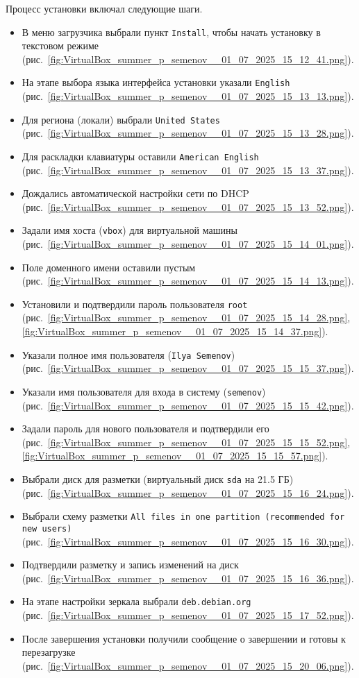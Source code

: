 Процесс установки включал следующие шаги.
\begin{itemize}
    \item В меню загрузчика выбрали пункт \texttt{Install}, чтобы начать установку в текстовом режиме (рис.~\ref{fig:VirtualBox_summer_p_semenov__01_07_2025_15_12_41.png}).
    \item На этапе выбора языка интерфейса установки указали \texttt{English} (рис.~\ref{fig:VirtualBox_summer_p_semenov__01_07_2025_15_13_13.png}).
    \item Для региона (локали) выбрали \texttt{United States} (рис.~\ref{fig:VirtualBox_summer_p_semenov__01_07_2025_15_13_28.png}).
    \item Для раскладки клавиатуры оставили \texttt{American English} (рис.~\ref{fig:VirtualBox_summer_p_semenov__01_07_2025_15_13_37.png}).
    \item Дождались автоматической настройки сети по DHCP (рис.~\ref{fig:VirtualBox_summer_p_semenov__01_07_2025_15_13_52.png}).
    \item Задали имя хоста (\texttt{vbox}) для виртуальной машины (рис.~\ref{fig:VirtualBox_summer_p_semenov__01_07_2025_15_14_01.png}).
    \item Поле доменного имени оставили пустым (рис.~\ref{fig:VirtualBox_summer_p_semenov__01_07_2025_15_14_13.png}).
    \item Установили и подтвердили пароль пользователя \texttt{root} (рис.~\ref{fig:VirtualBox_summer_p_semenov__01_07_2025_15_14_28.png}, \ref{fig:VirtualBox_summer_p_semenov__01_07_2025_15_14_37.png}).
    \item Указали полное имя пользователя (\texttt{Ilya Semenov}) (рис.~\ref{fig:VirtualBox_summer_p_semenov__01_07_2025_15_15_37.png}).
    \item Указали имя пользователя для входа в систему (\texttt{semenov}) (рис.~\ref{fig:VirtualBox_summer_p_semenov__01_07_2025_15_15_42.png}).
    \item Задали пароль для нового пользователя и подтвердили его (рис.~\ref{fig:VirtualBox_summer_p_semenov__01_07_2025_15_15_52.png}, \ref{fig:VirtualBox_summer_p_semenov__01_07_2025_15_15_57.png}).
    \item Выбрали диск для разметки (виртуальный диск \texttt{sda} на 21.5 ГБ) (рис.~\ref{fig:VirtualBox_summer_p_semenov__01_07_2025_15_16_24.png}).
    \item Выбрали схему разметки \texttt{All files in one partition (recommended for new users)} (рис.~\ref{fig:VirtualBox_summer_p_semenov__01_07_2025_15_16_30.png}).
    \item Подтвердили разметку и запись изменений на диск (рис.~\ref{fig:VirtualBox_summer_p_semenov__01_07_2025_15_16_36.png}).
    \item На этапе настройки зеркала выбрали \texttt{deb.debian.org} (рис.~\ref{fig:VirtualBox_summer_p_semenov__01_07_2025_15_17_52.png}).
    \item После завершения установки получили сообщение о завершении и готовы к перезагрузке (рис.~\ref{fig:VirtualBox_summer_p_semenov__01_07_2025_15_20_06.png}).
\end{itemize}

